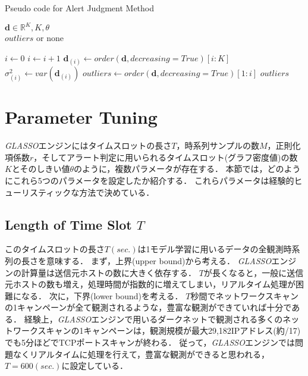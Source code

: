 \documentclass[conference]{IEEEtran}
\begin{document}
\begin{algorithm}[tb]
\caption{Pseudo code for Alert Judgment Method}
\label{alg2}
\begin{algorithmic}[1]
  \REQUIRE $\bm{d}\in\mathbb{R}^{K}, K, \theta$\\
  \ENSURE $outliers$ or none

  \STATE $i \gets 0$
    \STATE $i \gets i + 1$
    \STATE $\bm{d}_{(i)} \gets order(\bm{d}, decreasing=True)[i:K]$
    \STATE $\sigma_{(i)}^2 \gets var(\bm{d}_{(i)})$
      \STATE $outliers \gets order(\bm{d}, decreasing=True)[1:i]$
      \RETURN $outliers$
    \ENDIF
  \ENDWHILE
\end{algorithmic}
\end{algorithm}


\section{Parameter Tuning}
{\it GLASSO}エンジンにはタイムスロットの長さ$T$，時系列サンプルの数$M$，正則化項係数$r$，そしてアラート判定に用いられるタイムスロット(グラフ密度値)の数$K$とそのしきい値$\theta$のように，複数パラメータが存在する．
本節では，どのようにこれら5つのパラメータを設定したか紹介する．
これらパラメータは経験的ヒューリスティックな方法で決めている．

\subsection{Length of Time Slot $T$}
このタイムスロットの長さ$T (sec.)$は1モデル学習に用いるデータの全観測時系列の長さを意味する．
まず，上界(upper bound)から考える．
{\it GLASSO}エンジンの計算量は送信元ホストの数に大きく依存する．
$T$が長くなると，一般に送信元ホストの数も増え，処理時間が指数的に増えてしまい，リアルタイム処理が困難になる．
次に，下界(lower bound)を考える．
$T$秒間でネットワークスキャンの1キャンペーンが全て観測されるような，豊富な観測ができていれば十分である．
経験上，{\it GLASSO}エンジンで用いるダークネットで観測される多くのネットワークスキャンの1キャンペーンは，観測規模が最大29,182IPアドレス(約/17)でも5分ほどでTCPポートスキャンが終わる．
従って，{\it GLASSO}エンジンでは問題なくリアルタイムに処理を行えて，豊富な観測ができると思われる，$T=600 (sec.)$に設定している．
\end{document}
